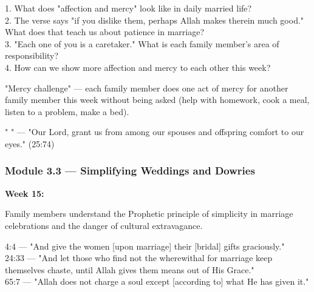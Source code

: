 \documentclass[11pt,a4paper]{article}
\begin{document}
\begin{discussionbox} 1. What does "affection and mercy" look like in daily married life? \\ 2. The verse says "if you dislike them, perhaps Allah makes therein much good." What does that teach us about patience in marriage? \\ 3. "Each one of you is a caretaker." What is each family member's area of responsibility? \\ 4. How can we show more affection and mercy to each other this week? \end{discussionbox}

\begin{activitybox} "Mercy challenge" --- each family member does one act of mercy for another family member this week without being asked (help with homework, cook a meal, listen to a problem, make a bed). \end{activitybox}

\begin{duabox} "       " --- "Our Lord, grant us from among our spouses and offspring comfort to our eyes." (25:74) \end{duabox}

\vspace{6pt}\noindent{\color{border}\rule{\textwidth}{0.5pt}}\vspace{6pt}

\subsubsection*{Module 3.3 --- Simplifying Weddings and Dowries}
\textbf{Week 15:} 

\begin{outcomebox} Family members understand the Prophetic principle of simplicity in marriage celebrations and the danger of cultural extravagance. \end{outcomebox}

\begin{quranbox} 4:4 --- "And give the women [upon marriage] their [bridal] gifts graciously." \\ 24:33 --- "And let those who find not the wherewithal for marriage keep themselves chaste, until Allah gives them means out of His Grace." \\ 65:7 --- "Allah does not charge a soul except [according to] what He has given it." \end{quranbox}
\end{document}
